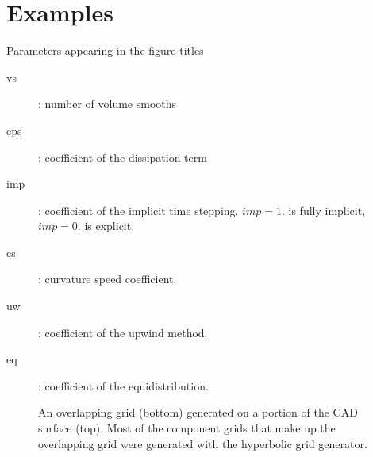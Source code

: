 \clearpage
\section{Examples}

Parameters appearing in the figure titles
\begin{description}
  \item[vs] : number of volume smooths
  \item[eps] : coefficient of the dissipation term
  \item[imp] : coefficient of the implicit time stepping. $imp=1.$ is fully implicit,
     $imp=0.$ is explicit.
  \item[cs] : curvature speed coefficient.
  \item[uw] : coefficient of the upwind method.
  \item[eq] : coefficient of the equidistribution.
\end{description}



{
\newcommand{\figWidthd}{9cm}
\newcommand{\trimfig}[2]{\trimPlot{#1}{#2}{.0}{.0}{.0}{.0}}
\begin{figure}[hbt]
\begin{center}
\end{center}
\caption{An overlapping grid (bottom) generated on a portion of the CAD surface (top). Most of the component grids
that make up the overlapping grid were generated with the hyperbolic grid generator.}
\end{figure}
}






